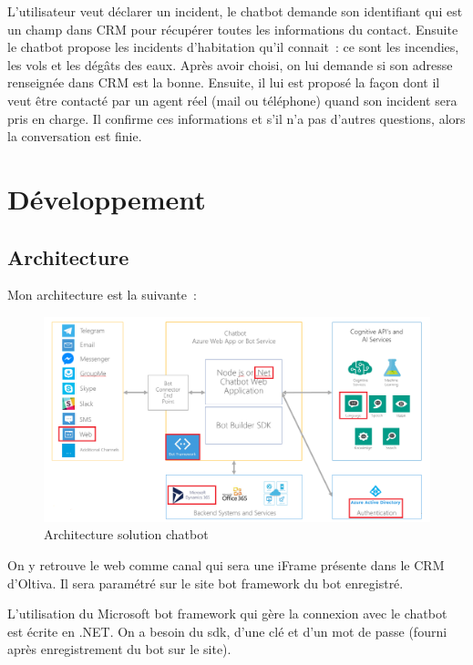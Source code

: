 L’utilisateur veut déclarer un incident, le chatbot demande son identifiant qui est un champ dans CRM pour récupérer toutes les informations du contact. Ensuite le chatbot propose les incidents d’habitation qu’il connait : ce sont les incendies, les vols et les dégâts des eaux. Après avoir choisi, on lui demande si son adresse renseignée dans CRM est la bonne. Ensuite, il lui est proposé la façon dont il veut être contacté par un agent réel (mail ou téléphone) quand son incident sera pris en charge. Il confirme ces informations et s’il n’a pas d’autres questions, alors la conversation est finie.


\section{Développement}

\subsection{Architecture}

Mon architecture est la suivante :


\begin{figure}[H]
	\centering
		\includegraphics[width = \textwidth]{archi.png}
	\caption{Architecture solution chatbot}
	\label{fig:Architecture solution chatbot}
\end{figure}

On y retrouve le web comme canal qui sera une iFrame présente dans le CRM d’Oltiva. Il sera paramétré sur le site bot framework du bot enregistré.
\vspace{1em}

L’utilisation du Microsoft bot framework qui gère la connexion avec le chatbot est écrite en .NET. On a besoin du sdk, d’une clé et d’un mot de passe (fourni après enregistrement du bot sur le site).
\vspace{1em}

